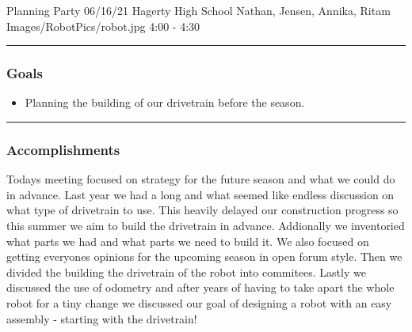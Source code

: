 \insertmeeting 
	{Planning Party} 
	{06/16/21}
	{Hagerty High School}
	{Nathan, Jensen, Annika, Ritam}
	{Images/RobotPics/robot.jpg}
	{4:00 - 4:30}
	
\noindent\hfil\rule{\textwidth}{.4pt}\hfil
\subsubsection*{Goals}
\begin{itemize}
    \item Planning the building of our drivetrain before the season.

\end{itemize} 

\noindent\hfil\rule{\textwidth}{.4pt}\hfil

\subsubsection*{Accomplishments}
Todays meeting focused on strategy for the future season and what we could do in advance. Last year we had a long and what seemed like endless discussion on what type of drivetrain to use. This heavily delayed our construction progress so this summer we aim to build the drivetrain in advance. Addionally we inventoried what parts we had and what parts we need to build it. We also focused on getting everyones opinions for the upcoming season in open forum style. Then we divided the building the drivetrain of the robot into commitees. Lastly we discussed the use of odometry and after years of having to take apart the whole robot for a tiny change we discussed our goal of designing a robot with an easy assembly - starting with the drivetrain!






